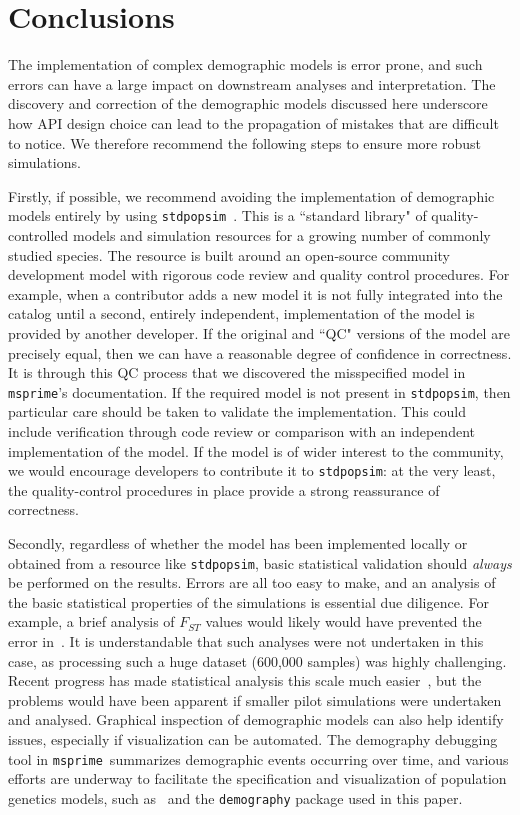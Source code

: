 \documentclass{article}
\newcommand{\msprime}[0]{\texttt{msprime}}
\newcommand{\stdpopsim}[0]{\texttt{stdpopsim}}
\begin{document}
\section*{Conclusions}

The implementation of complex demographic models is error prone, and such errors
can have a large impact on downstream analyses and interpretation.
The discovery and correction of the demographic models discussed here underscore
how API design choice can lead to the propagation of mistakes that are difficult
to notice. We therefore recommend the following steps to ensure more robust simulations.

Firstly, if possible, we recommend avoiding the implementation of
demographic models entirely by using \stdpopsim~\citep{adrion2019community}.
This is a ``standard library" of quality-controlled
models and simulation resources for a growing number of commonly studied species.
The resource is built around an open-source community development model
with rigorous code review and quality control procedures.
For example, when a contributor adds a new model it is not fully integrated
into the catalog until a second, entirely independent, implementation of the
model is provided by another developer. If the original and ``QC" versions
of the model are precisely equal, then we can have a reasonable degree
of confidence in correctness. It is through this QC process that we discovered
the misspecified model in \msprime's documentation.
If the required model is not present in \stdpopsim, then particular care should
be taken to validate the implementation.
This could include verification through code review or comparison with an
independent implementation of the model. If the model is of wider interest to
the community, we would encourage developers to contribute it to \stdpopsim:
at the very least, the quality-control procedures in place provide a strong
reassurance of correctness.

Secondly, regardless of whether the model has been implemented
locally or obtained from a resource like \stdpopsim,
basic statistical validation should \emph{always} be performed on the
results. Errors are all too easy to make, and an analysis of the
basic statistical properties of the simulations is essential
due diligence. For example, a brief analysis of $F_{ST}$ values
would likely would have prevented the error in~\citet{martin2017human}.
It is understandable that such analyses were not undertaken in this
case, as processing such a huge dataset (600,000 samples) was
highly challenging. Recent progress has made statistical analysis this scale much
easier~\citep{ralph2020efficiently}, but the problems would have been
apparent if smaller pilot simulations were undertaken and analysed.
Graphical inspection of demographic models can also help identify issues, especially if
visualization can be automated. The demography debugging tool in \msprime\
summarizes demographic events occurring over time, and various efforts are underway to facilitate
the specification and visualization of population genetics models, such as~\citet{zhou2018popdemog}
and the \texttt{demography} package used in this paper.
\end{document}
